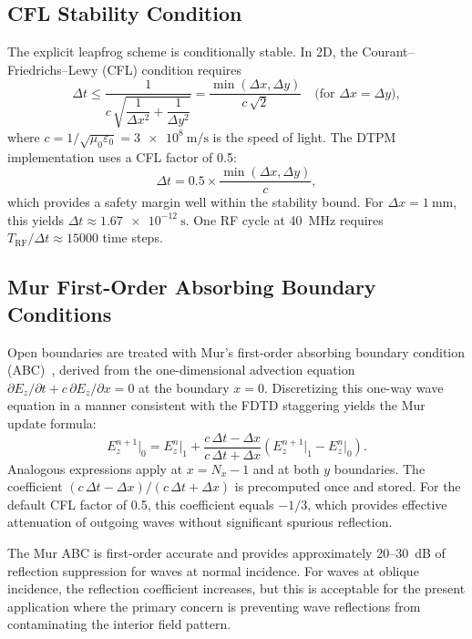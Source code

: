 \documentclass[11pt,a4paper]{report}
\newcommand{\dt}{\Delta t}
\newcommand{\dx}{\Delta x}
\newcommand{\dy}{\Delta y}
\begin{document}
\subsection{CFL Stability Condition}

The explicit leapfrog scheme is conditionally stable.  In 2D, the Courant--Friedrichs--Lewy (CFL) condition requires
\begin{equation}
  \dt \le \frac{1}{c\,\sqrt{\dfrac{1}{\dx^2} + \dfrac{1}{\dy^2}}}
  = \frac{\min(\dx, \dy)}{c\,\sqrt{2}} \quad\text{(for } \dx = \dy\text{)},
  \label{eq:fdtd-cfl}
\end{equation}
where $c = 1/\sqrt{\mu_0\varepsilon_0} = \SI{3e8}{\meter\per\second}$ is the speed of light.  The DTPM implementation uses a CFL factor of 0.5:
\begin{equation}
  \dt = 0.5 \times \frac{\min(\dx, \dy)}{c},
  \label{eq:fdtd-dt}
\end{equation}
which provides a safety margin well within the stability bound.  For $\dx = \SI{1}{\milli\meter}$, this yields $\dt \approx \SI{1.67e-12}{\second}$.  One RF cycle at \SI{40}{\mega\hertz} requires $T_\mathrm{RF}/\dt \approx 15000$ time steps.

\subsection{Mur First-Order Absorbing Boundary Conditions}

Open boundaries are treated with Mur's first-order absorbing boundary condition (ABC)~\cite{Mur1981}, derived from the one-dimensional advection equation $\partial E_z / \partial t + c\,\partial E_z / \partial x = 0$ at the boundary $x = 0$.  Discretizing this one-way wave equation in a manner consistent with the FDTD staggering yields the Mur update formula:
\begin{equation}
  \boxed{
  E_z^{n+1}\big|_0 = E_z^{n}\big|_1
    + \frac{c\,\dt - \dx}{c\,\dt + \dx}
    \left(E_z^{n+1}\big|_1 - E_z^{n}\big|_0\right).}
  \label{eq:mur-abc}
\end{equation}
Analogous expressions apply at $x = N_x - 1$ and at both $y$ boundaries.  The coefficient $(c\,\dt - \dx)/(c\,\dt + \dx)$ is precomputed once and stored.  For the default CFL factor of 0.5, this coefficient equals $-1/3$, which provides effective attenuation of outgoing waves without significant spurious reflection.

The Mur ABC is first-order accurate and provides approximately 20--30~dB of reflection suppression for waves at normal incidence.  For waves at oblique incidence, the reflection coefficient increases, but this is acceptable for the present application where the primary concern is preventing wave reflections from contaminating the interior field pattern.
\end{document}
